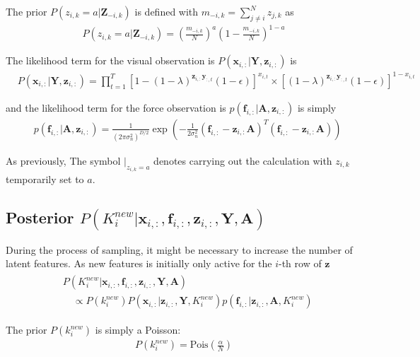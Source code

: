 \documentclass[]{article}
\begin{document}
The prior $P(z_{i,k}=a| \mathbf{Z}_{-i,k})$ is defined with $m_{-i,k} = \sum_{j\not=i}^{N} z_{j,k}$ as
\begin{align}
	P(z_{i,k}=a| \mathbf{Z}_{-i,k}) = (\frac{m_{-i,k}}{N})^a (1 - \frac{m_{-i,k}}{N})^{1-a}
\end{align}


The likelihood term for the visual observation is $P(\mathbf{x}_{i,:}|\mathbf{Y}, \mathbf{z}_{i,:})$ is 
\begin{align}
	&P(\mathbf{x}_{i,:}|\mathbf{Y}, \mathbf{z}_{i,:}) = \prod_{t=1}^{T} \left[1 - (1-\lambda)^{\mathbf{z}_{i,:}\mathbf{y}_{:,t}}(1-\epsilon)\right]^{x_{i,t}} \times \left[ (1-\lambda)^{\mathbf{z}_{i,:}\mathbf{y}_{:,t}}(1-\epsilon)\right]^{1 - x_{i,t}} 
\end{align}

\noindent and the likelihood term for the force observation is $p(\mathbf{f}_{i,:}|\mathbf{A}, \mathbf{z}_{i,:})$ is simply
\begin{align}
	&p(\mathbf{f}_{i,:}|\mathbf{A}, \mathbf{z}_{i,:}) = \frac{1}{(2\pi\sigma^2_n)^{D/2}} \exp \left(-\frac{1}{2\sigma^2_n} (\mathbf{f}_{i,:} - \mathbf{z}_{i,:} \mathbf{A})^T (\mathbf{f}_{i,:} - \mathbf{z}_{i,:} \mathbf{A}) \right)
\end{align}

As previously, The symbol $|_{z_{i,k}=a}$ denotes carrying out the calculation with $z_{i,k}$ temporarily set to $a$.

\subsection{Posterior $P(K^{new}_i | \mathbf{x}_{i,:},  \mathbf{f}_{i,:}, \mathbf{z}_{i,: }, \mathbf{Y}, \mathbf{A}) $}
During the process of sampling, it might be necessary to increase the number of latent features. As new features is initially only active for the $i$-th row of $\mathbf{z}$
	\begin{align}
		\begin{split}\label{eq:posterior_Knew}
		&P(K^{new}_i | \mathbf{x}_{i,:},  \mathbf{f}_{i,:}, \mathbf{z}_{i,: }, \mathbf{Y}, \mathbf{A}) \\
		&\quad \propto P(k^{new}_i) P(\mathbf{x}_{i,:}| \mathbf{z}_{i,:}, \mathbf{Y}, K^{new}_i) p(\mathbf{f}_{i,:}|\mathbf{z}_{i,:}, \mathbf{A}, K^{new}_i)
	\end{split}
	\end{align}

The prior $P(k^{new}_i)$ is simply a Poisson:
\begin{align}
	P(k^{new}_i) = \text{Pois}\left(\frac{\alpha}{N}\right)
\end{align}
	
\end{document}
